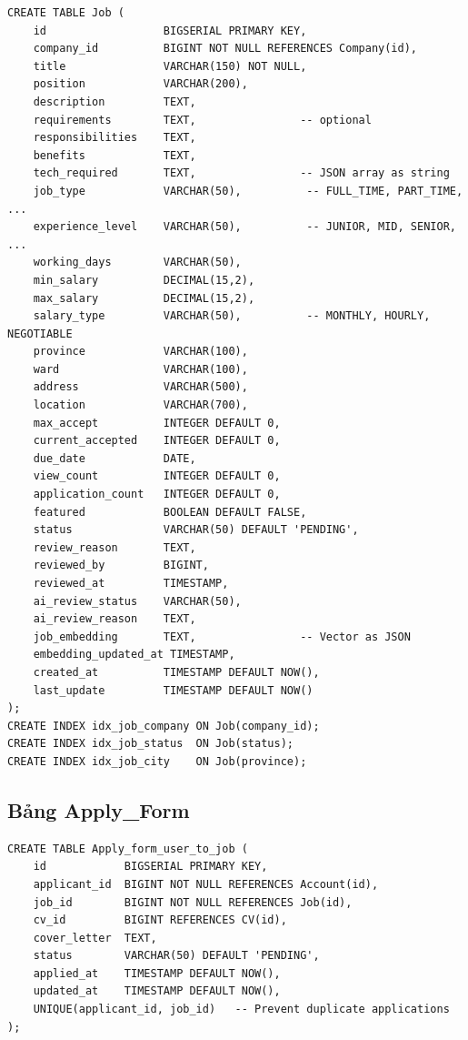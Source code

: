\documentclass[12pt, a4paper]{report}
\begin{document}
\begin{lstlisting}[style=sqlstyle]
CREATE TABLE Job (
    id                  BIGSERIAL PRIMARY KEY,
    company_id          BIGINT NOT NULL REFERENCES Company(id),
    title               VARCHAR(150) NOT NULL,
    position            VARCHAR(200),
    description         TEXT,
    requirements        TEXT,                -- optional
    responsibilities    TEXT,
    benefits            TEXT,
    tech_required       TEXT,                -- JSON array as string
    job_type            VARCHAR(50),          -- FULL_TIME, PART_TIME, ...
    experience_level    VARCHAR(50),          -- JUNIOR, MID, SENIOR, ...
    working_days        VARCHAR(50),
    min_salary          DECIMAL(15,2),
    max_salary          DECIMAL(15,2),
    salary_type         VARCHAR(50),          -- MONTHLY, HOURLY, NEGOTIABLE
    province            VARCHAR(100),
    ward                VARCHAR(100),
    address             VARCHAR(500),
    location            VARCHAR(700),
    max_accept          INTEGER DEFAULT 0,
    current_accepted    INTEGER DEFAULT 0,
    due_date            DATE,
    view_count          INTEGER DEFAULT 0,
    application_count   INTEGER DEFAULT 0,
    featured            BOOLEAN DEFAULT FALSE,
    status              VARCHAR(50) DEFAULT 'PENDING',
    review_reason       TEXT,
    reviewed_by         BIGINT,
    reviewed_at         TIMESTAMP,
    ai_review_status    VARCHAR(50),
    ai_review_reason    TEXT,
    job_embedding       TEXT,                -- Vector as JSON
    embedding_updated_at TIMESTAMP,
    created_at          TIMESTAMP DEFAULT NOW(),
    last_update         TIMESTAMP DEFAULT NOW()
);
CREATE INDEX idx_job_company ON Job(company_id);
CREATE INDEX idx_job_status  ON Job(status);
CREATE INDEX idx_job_city    ON Job(province);
\end{lstlisting}

\subsection{Bảng Apply\_Form}

\begin{lstlisting}[style=sqlstyle]
CREATE TABLE Apply_form_user_to_job (
    id            BIGSERIAL PRIMARY KEY,
    applicant_id  BIGINT NOT NULL REFERENCES Account(id),
    job_id        BIGINT NOT NULL REFERENCES Job(id),
    cv_id         BIGINT REFERENCES CV(id),
    cover_letter  TEXT,
    status        VARCHAR(50) DEFAULT 'PENDING',
    applied_at    TIMESTAMP DEFAULT NOW(),
    updated_at    TIMESTAMP DEFAULT NOW(),
    UNIQUE(applicant_id, job_id)   -- Prevent duplicate applications
);
\end{lstlisting}
\end{document}
